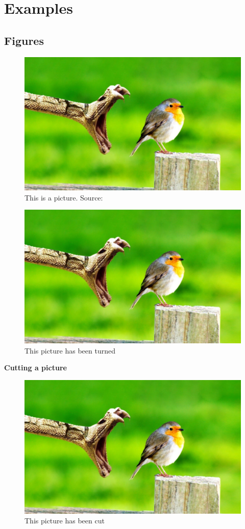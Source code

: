 \chapter{Examples}

\section{Figures}



\begin{figure} [H]
	\centering
	\includegraphics[width=.6\textwidth]{Pictures/Example.jpg}	
	\caption{This is a picture. Source: \citet{isover}}
	\label{Bird}
\end{figure}


\begin{figure} [H]
	\centering
	\includegraphics[width=.6\textwidth, angle=-90]{Pictures/Example.jpg}	
	\caption{This picture has been turned}
	\label{BirdTurned}
\end{figure}


\textbf{Cutting a picture}

\begin{figure} [H]
	\centering
    \includegraphics[width=.5\textwidth, trim={23cm 0 0 0},clip]{Pictures/Example.jpg}
	\caption{This picture has been cut}
	\label{BirdCut}
\end{figure}


